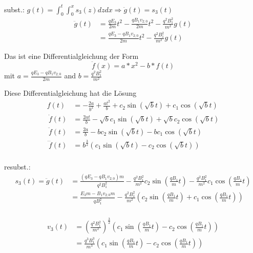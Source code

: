 \documentclass[german, a4paper, 10pt]{article}
\begin{document}
subst.: $g(t) = \int_0^t \int_0^x s_3(z) dz dx \Rightarrow \ddot{g}(t) = s_3(t)$
%
\begin{equation}
\begin{split}
\ddot{g}(t) 	&= \frac{q E_3}{2m} t^2 - \frac{q B_1 v_{2;0}}{2m} t^2 - \frac{q^2 B_1^2}{m^2} g(t) \\\
			&= \frac{q E_3 - q B_1 v_{2;0}}{2m} t^2 - \frac{q^2 B_1^2}{m^2} g(t)
\end{split}
\end{equation}

Das ist eine Differentialgleichung der Form 
\begin{equation}
\ddot{f}(x) = a * x^2 - b * f(t)
\end{equation}
mit $a=\frac{q E_3 - q B_1 v_{2;0}}{2m}$ and $b=\frac{q^2 B_1^2}{m^2}$

Diese Differentialgleichung hat die Lösung
\begin{equation}
\begin{split}
f(t) &= -\frac{2 a}{b^2} + \frac{a t^2}{b} + c_2 \sin\left(\sqrt{b} t\right) + c_1 \cos\left(\sqrt{b} t\right) \\\
\dot{f}(t) &= \frac{2 a t}{b} - \sqrt{b} c_1 \sin\left(\sqrt{b} t\right) + \sqrt{b} c_2 \cos\left(\sqrt{b} t\right) \\\
\ddot{f}(t) &= \frac{2 a}{b} - b c_2 \sin\left(\sqrt{b} t\right) - b c_1 \cos\left(\sqrt{b} t\right) \\\
\dddot{f}(t) &= b^{\frac{3}{2}} \left(c_1 \sin\left(\sqrt{b} t\right) - c_2 \cos\left(\sqrt{b} t\right)\right) \\\
\end{split}
\end{equation}

resubst.:
\begin{equation}
\begin{split}
s_3(t) = \ddot{g}(t) &= \frac{(q E_3 - q B_1 v_{2;0}) m}{q^2 B_1^2} - \frac{q^2 B_1^2}{m^2} c_2 \sin\left(\frac{q B_1}{m} t\right) - \frac{q^2 B_1^2}{m^2} c_1 \cos\left(\frac{q B_1}{m} t\right) \\\
&= \frac{E_3 m - B_1 v_{2;0} m}{q B_1^2} - \frac{q^2 B_1^2}{m^2} \left(c_2 \sin\left(\frac{q B_1}{m} t\right) + c_1 \cos\left(\frac{q B_1}{m} t\right)\right) \\\
\end{split}
\end{equation}

\begin{equation}
\begin{split}
v_3(t)  &= \left(\frac{q^2 B_1^2}{m^2}\right)^{\frac{3}{2}} \left(c_1 \sin\left(\frac{q B_1}{m} t\right) - c_2 \cos\left(\frac{q B_1}{m} t\right)\right) \\\
		&= \frac{q^3 B_1^3}{m^3} \left(c_1 \sin\left(\frac{q B_1}{m} t\right) - c_2 \cos\left(\frac{q B_1}{m} t\right)\right)
\end{split}
\end{equation}
\end{document}
